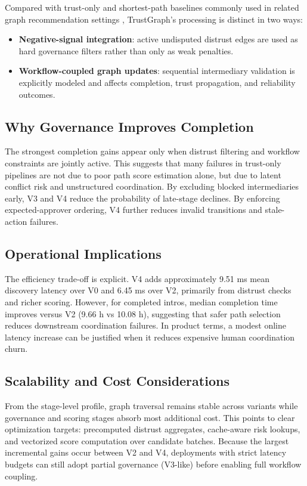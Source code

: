 \documentclass[conference]{IEEEtran}
\begin{document}
Compared with trust-only and shortest-path baselines commonly used in related graph recommendation settings \cite{golbeck2006trust,kamvar2003eigentrust}, TrustGraph's processing is distinct in two ways:
\begin{itemize}
    \item \textbf{Negative-signal integration}: active undisputed distrust edges are used as hard governance filters rather than only as weak penalties.
    \item \textbf{Workflow-coupled graph updates}: sequential intermediary validation is explicitly modeled and affects completion, trust propagation, and reliability outcomes.
\end{itemize}

\subsection{Why Governance Improves Completion}
The strongest completion gains appear only when distrust filtering and workflow constraints are jointly active. This suggests that many failures in trust-only pipelines are not due to poor path score estimation alone, but due to latent conflict risk and unstructured coordination. By excluding blocked intermediaries early, V3 and V4 reduce the probability of late-stage declines. By enforcing expected-approver ordering, V4 further reduces invalid transitions and stale-action failures.

\subsection{Operational Implications}
The efficiency trade-off is explicit. V4 adds approximately 9.51 ms mean discovery latency over V0 and 6.45 ms over V2, primarily from distrust checks and richer scoring. However, for completed intros, median completion time improves versus V2 (9.66 h vs 10.08 h), suggesting that safer path selection reduces downstream coordination failures. In product terms, a modest online latency increase can be justified when it reduces expensive human coordination churn.

\subsection{Scalability and Cost Considerations}
From the stage-level profile, graph traversal remains stable across variants while governance and scoring stages absorb most additional cost. This points to clear optimization targets: precomputed distrust aggregates, cache-aware risk lookups, and vectorized score computation over candidate batches. Because the largest incremental gains occur between V2 and V4, deployments with strict latency budgets can still adopt partial governance (V3-like) before enabling full workflow coupling.
\end{document}
